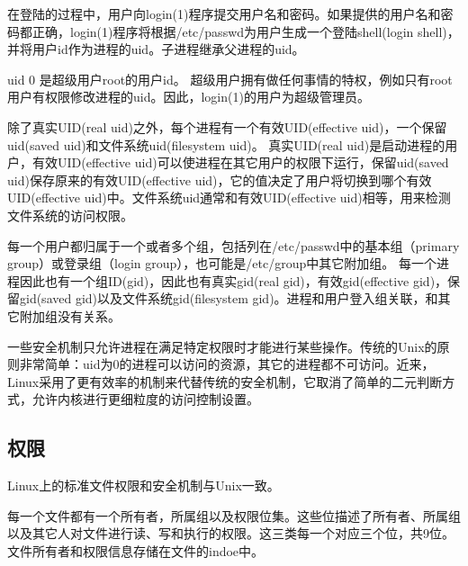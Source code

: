 在登陆的过程中，用户向login(1)程序提交用户名和密码。如果提供的用户名和密码都正确，login(1)程序将根据/etc/passwd为用户生成一个登陆shell(login shell)，并将用户id作为进程的uid。子进程继承父进程的uid。

uid 0 是超级用户root的用户id。 超级用户拥有做任何事情的特权，例如只有root用户有权限修改进程的uid。因此，login(1)的用户为超级管理员。

除了真实UID(real uid)之外，每个进程有一个有效UID(effective uid)，一个保留uid(saved uid)和文件系统uid(filesystem uid)。 真实UID(real uid)是启动进程的用户，有效UID(effective uid)可以使进程在其它用户的权限下运行，保留uid(saved uid)保存原来的有效UID(effective uid)，它的值决定了用户将切换到哪个有效UID(effective uid)中。文件系统uid通常和有效UID(effective uid)相等，用来检测文件系统的访问权限。

每一个用户都归属于一个或者多个组，包括列在/etc/passwd中的基本组（primary group）或登录组（login group），也可能是/etc/group中其它附加组。 每一个进程因此也有一个组ID(gid)，因此也有真实gid(real gid)，有效gid(effective gid)，保留gid(saved gid)以及文件系统gid(filesystem gid)。进程和用户登入组关联，和其它附加组没有关系。

一些安全机制只允许进程在满足特定权限时才能进行某些操作。传统的Unix的原则非常简单：uid为0的进程可以访问的资源，其它的进程都不可访问。近来，Linux采用了更有效率的机制来代替传统的安全机制，它取消了简单的二元判断方式，允许内核进行更细粒度的访问控制设置。

\subsection{权限}

Linux上的标准文件权限和安全机制与Unix一致。

每一个文件都有一个所有者，所属组以及权限位集。这些位描述了所有者、所属组以及其它人对文件进行读、写和执行的权限。这三类每一个对应三个位，共9位。 文件所有者和权限信息存储在文件的indoe中。

